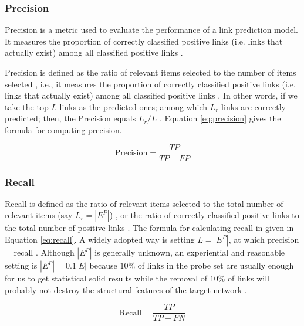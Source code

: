 

\subsubsection{Precision}

Precision is a metric used to evaluate the performance of a link prediction model. It measures the proportion of correctly classified positive links (i.e. links that actually exist) among all classified positive links \cite{arrar2023comprehensive}.

Precision is defined as the ratio of relevant items selected to the number of items selected \cite{zhou2021progresses}, i.e., it measures the proportion of correctly classified positive links (i.e. links that actually exist) among all classified positive links \cite{arrar2023comprehensive}. In other words, if we take the top-$L$ links as the predicted ones; among which $L_r$ links are correctly predicted; then, the Precision equals $L_r/L$ \cite{zhou2021progresses}. Equation \ref{eq:precision} gives the formula for computing precision.

\begin{equation}
\label{eq:precision}
  \text{Precision} = \frac{TP}{TP + FP}
\end{equation}


\subsubsection{Recall}

Recall is defined as the ratio of relevant items selected to the total number of relevant items (say $L_r = |E^P|$) \cite{zhou2021progresses}, or the ratio of correctly classified positive links to the total number of positive links \cite{arrar2023comprehensive}. The formula for calculating recall in given in Equation \ref{eq:recall}. A widely adopted way is setting $L = |E^P|$, at which precision = recall \cite{lu2011link, liben2003link, zhou2021progresses}. Although $|E^P|$ is generally unknown, an experiential and reasonable setting is  $|E^P| = 0.1 |E|$ because $10\%$ of links in the probe set are usually enough for us to get statistical solid results while the removal of $10\%$ of links will probably not destroy the structural features of the target network \cite{lu2015toward}.

\begin{equation}
\label{eq:recall}
  \text{Recall} = \frac{TP}{TP + FN}
\end{equation}


